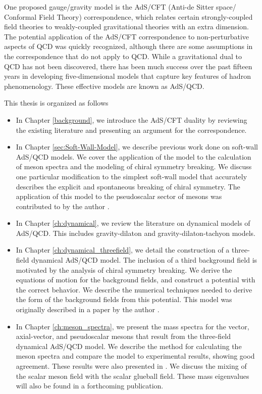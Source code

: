 One proposed gauge/gravity model is the AdS/CFT (Anti-de Sitter space/ Conformal Field Theory) correspondence, which relates certain strongly-coupled field theories to weakly-coupled gravitational theories with an extra dimension.
The potential application of the AdS/CFT correspondence to non-perturbative aspects of QCD was quickly recognized, although there are some assumptions in the correspondence that do not apply to QCD.
While a gravitational dual to QCD has not been discovered, there has been much success over the past fifteen years in developing five-dimensional models that capture key features of hadron phenomenology.
These effective models are known as AdS/QCD.

This thesis is organized as follows
\begin{itemize}

\item In Chapter \ref{background}, we introduce the AdS/CFT duality by reviewing the existing literature and presenting an argument for the correspondence.

\item In Chapter \ref{sec:Soft-Wall-Model}, we describe previous work done on soft-wall AdS/QCD models. 
We cover the application of the model to the calculation of meson spectra and the modeling of chiral symmetry breaking.
We discuss one particular modification to the simplest soft-wall model that accurately describes the explicit and spontaneous breaking of chiral symmetry. 
The application of this model to the pseudoscalar sector of mesons was contributed to by the author \cite{bartz-pions}.

\item In Chapter \ref{ch:dynamical}, we review the literature on dynamical models of AdS/QCD. 
This includes gravity-dilaton and gravity-dilaton-tachyon models.

\item In Chapter \ref{ch:dynamical_threefield}, we detail the construction of a three-field dynamical AdS/QCD model.
The inclusion of a third background field is motivated by the analysis of chiral symmetry breaking. 
We derive the equations of motion for the background fields, and construct a potential with the correct behavior.
We describe the numerical techniques needed to derive the form of the background fields from this potential.
This model was originally described in a paper by the author \cite{Bartz2014}.

\item In Chapter \ref{ch:meson_spectra}, we present the mass spectra for the vector, axial-vector, and pseudoscalar mesons that result from the three-field dynamical AdS/QCD model.
We describe the method for calculating the meson spectra and compare the model to experimental results, showing good agreement. 
These results were also presented in \cite{Bartz2014}.
We discuss the mixing of the scalar meson field with the scalar glueball field. 
These mass eigenvalues will also be found in a forthcoming publication.



\end{itemize}
